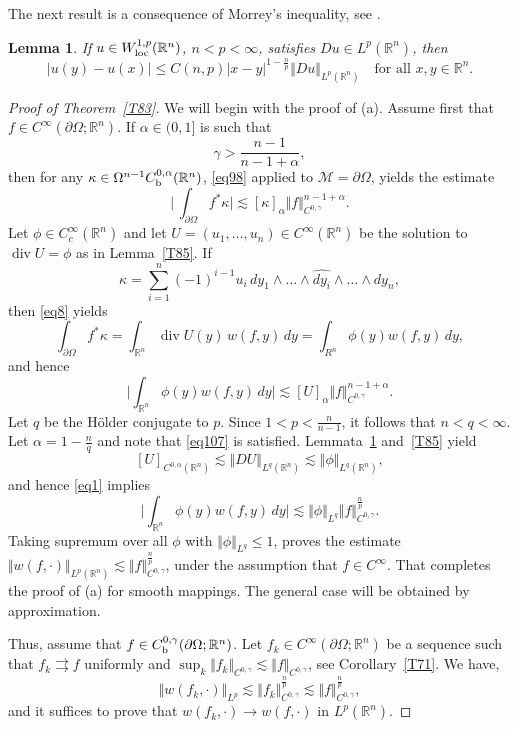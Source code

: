 \documentclass[intlimits,12pt,reqno]{amsart}
\newcommand{\cM}{\mathcal M}
\newcommand{\bbbr}{\mathbb R}
\newcommand{\R}{\mathbb R}
\numberwithin{equation}{section}
\newtheorem{lemma}[theorem]{Lemma}
\theoremstyle{definition}
\begin{document}
The next result is a consequence of Morrey's inequality, see \cite[Section~4.5.3]{EG}.
\begin{lemma}
\label{T86}
If $u\in W^{1,p}_{\rm loc}(\R^n)$, $n<p<\infty$, satisfies $Du\in L^p(\bbbr^n)$, then
$$
|u(y)-u(x)|\leq C(n,p)|x-y|^{1-\frac{n}{p}}\Vert Du\Vert_{L^p(\R^n)} 
\quad
\text{for all } x,y\in\R^n.
$$
\end{lemma}
\begin{proof}[Proof of Theorem~\ref{T83}]
We will begin with the proof of (a).
Assume first that $f\in C^\infty(\partial\Omega;\R^n)$.
If $\alpha\in(0,1]$ is such that
\begin{equation}
\label{eq107}
\gamma>\frac{n-1}{n-1+\alpha},
\end{equation}
then for any $\kappa\in \Omega^{n-1}C_{\rm b}^{0,\alpha}(\R^n)$, \eqref{eq98} applied to $\cM=\partial\Omega$, yields the estimate
$$
\Bigg|\, \int_{\partial\Omega} f^*\kappa\Bigg|\lesssim
[\kappa]_{\alpha} \Vert f\Vert^{n-1+\alpha}_{C^{0,\gamma}}.
$$
Let $\phi\in C_c^\infty(\R^n)$ and let $U=(u_1,\ldots,u_n)\in C^\infty(\R^n)$ be the solution to $\operatorname{div} U=\phi$ as in Lemma~\ref{T85}. If
$$
\kappa=\sum_{i=1}^n(-1)^{i-1}u_i\, dy_1\wedge\ldots\wedge\widehat{dy_i}\wedge\ldots\wedge dy_n,
$$
then \eqref{eq8} yields
$$
\int_{\partial\Omega} f^*\kappa=\int_{\R^n}\operatorname{div} U(y)\,  w(f,y)\, dy=
\int_{R^n}\phi(y) w(f,y)\, dy,
$$
and hence
\begin{equation}
\label{eq1}
\Bigg| \int_{\R^n}\phi(y)w(f,y)\, dy\Bigg|\lesssim
[U]_{\alpha} \Vert f\Vert^{n-1+\alpha}_{C^{0,\gamma}}.
\end{equation}
Let $q$ be the H\"older conjugate to $p$. Since $1<p<\frac{n}{n-1}$, it follows that $n<q<\infty$.
Let $\alpha=1-\frac{n}{q}$ and note that \eqref{eq107} is satisfied. Lemmata~\ref{T86} and~\ref{T85} yield
$$
[U]_{C^{0,\alpha}(\R^n)}\lesssim\Vert DU\Vert_{L^q(\R^n)}\lesssim\Vert\phi\Vert_{L^q(\R^n)},
$$
and hence \eqref{eq1} implies
$$
\Bigg|\int_{\R^n}\phi(y)w(f,y)\, dy\Bigg|\lesssim\Vert\phi\Vert_{L^q}\Vert f\Vert_{C^{0,\gamma}}^{\frac{n}{p}}.
$$
Taking supremum over all $\phi$ with $\Vert\phi\Vert_{L^q}\leq 1$, proves the  estimate
$\Vert w(f,\cdot)\Vert_{L^p(\R^n)}\lesssim\Vert f\Vert_{C^{0,\gamma}}^{\frac{n}{p}}$, under the assumption that $f\in C^\infty$. That completes the proof of (a) for smooth mappings. 
The general case will be obtained by approximation. 

Thus, assume that $f\in C_{\rm b}^{0,\gamma}(\partial\Omega;\R^n)$. Let $f_k\in C^\infty(\partial\Omega;\R^n)$ be a sequence 
such that $f_k\rightrightarrows f$ uniformly and $\sup_k\Vert f_k\Vert_{C^{0,\gamma}}\lesssim\Vert f\Vert_{C^{0,\gamma}}$, see
Corollary~\ref{T71}. We have,
$$
\Vert w(f_k,\cdot)\Vert_{L^p}\lesssim\Vert f_k\Vert_{C^{0,\gamma}}^{\frac{n}{p}}\lesssim\Vert f\Vert_{C^{0,\gamma}}^{\frac{n}{p}},
$$
and it suffices to prove that $w(f_k,\cdot)\to w(f,\cdot)$ in $L^p(\R^n)$.


\end{proof}
\end{document}
